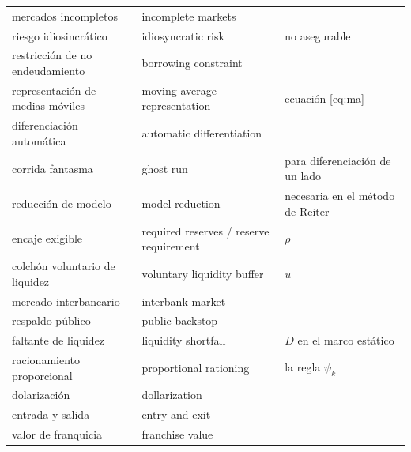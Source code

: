 \begin{center}
\begin{tabular}{@{}p{}p{}p{}@{}}
mercados incompletos & incomplete markets & \\
riesgo idiosincrático & idiosyncratic risk & no asegurable\\
restricción de no endeudamiento & borrowing constraint & \\
representación de medias móviles & moving-average representation & ecuación \eqref{eq:ma}\\
diferenciación automática & automatic differentiation & \\
corrida fantasma & ghost run & para diferenciación de un lado\\
reducción de modelo & model reduction & necesaria en el método de Reiter\\
encaje exigible & required reserves / reserve requirement & $\rho$\\
colchón voluntario de liquidez & voluntary liquidity buffer & $u$\\
mercado interbancario & interbank market & \\
respaldo público & public backstop & \\
faltante de liquidez & liquidity shortfall & $D$ en el marco estático\\
racionamiento proporcional & proportional rationing & la regla $\psi_k$\\
dolarización & dollarization & \\
entrada y salida & entry and exit & \\
valor de franquicia & franchise value & \\
\bottomrule
\end{tabular}
\end{center}
